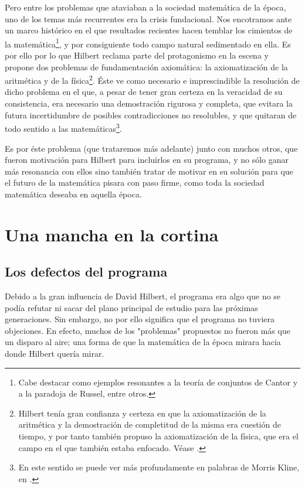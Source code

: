 Pero entre los problemas que ataviaban a la sociedad matemática de la época, uno de los temas más recurrentes era la crisis fundacional. Nos encotramos ante un marco histórico 
en el que resultados recientes hacen temblar los cimientos de la matemática\footnote{Cabe destacar como ejemplos resonantes a la teoría de conjuntos de Cantor y a la paradoja 
de Russel, entre otros.}, y por consiguiente todo campo natural sedimentado en ella. Es por ello por lo que Hilbert reclama parte del protagonismo en la escena y propone dos problemas
de fundamentación axiomática: la axiomatización de la aritmética y de la física\footnote{Hilbert tenía gran confianza y certeza en que la axiomatización de la aritmética y la demostración de 
completitud de la misma era cuestión de tiempo, y por tanto también propuso la axiomatización de la física, que era el campo en el que también estaba enfocado. Véase \cite{kreisel1976have}.}.
Éste ve como necesario e imprescindible la resolución de dicho problema en el que, a pesar de tener gran certeza en la veracidad de su consistencia, era necesario una demostración rigurosa
y completa, que evitara la futura incertidumbre de posibles contradicciones no resolubles, y que quitaran de todo sentido a las matemáticas\footnote{En este sentido se puede ver más profundamente 
en palabras de Morris Kline, en \cite{kline2000matematicas}.}.

Es por éste problema (que trataremos más adelante) junto con muchos otros, que fueron motivación para Hilbert para incluirlos en su programa, y no sólo ganar más resonancia con ellos sino 
también tratar de motivar en su solución para que el futuro de la matemática pisara con paso firme, como toda la sociedad matemática deseaba en aquella época.

\chapter{Una mancha en la cortina} \label{ch:Hilbert-2}

\section{Los defectos del programa}

Debido a la gran influencia de David Hilbert, el programa era algo que no se podía refutar ni sacar del plano principal de estudio para las próximas generaciones. Sin embargo,
no por ello significa que el programa no tuviera objeciones. En efecto, muchos de los "problemas" propuestos no fueron más que un disparo al aire; una forma de que la matemática 
de la época mirara hacia donde Hilbert quería mirar. 

